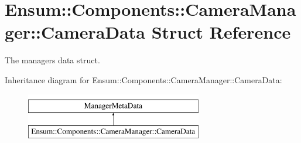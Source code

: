 \hypertarget{struct_ensum_1_1_components_1_1_camera_manager_1_1_camera_data}{}\section{Ensum\+:\+:Components\+:\+:Camera\+Manager\+:\+:Camera\+Data Struct Reference}
\label{struct_ensum_1_1_components_1_1_camera_manager_1_1_camera_data}


The managers data struct.  


Inheritance diagram for Ensum\+:\+:Components\+:\+:Camera\+Manager\+:\+:Camera\+Data\+:\begin{figure}[H]
\begin{center}
\leavevmode
\includegraphics[height=2.000000cm]{struct_ensum_1_1_components_1_1_camera_manager_1_1_camera_data}
\end{center}
\end{figure}
